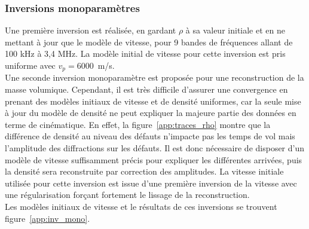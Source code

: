 
\subsubsection{Inversions monoparamètres}


Une première inversion est réalisée, en gardant $\rho$ à sa valeur initiale et en ne mettant à jour que le modèle de vitesse, pour 9 bandes de fréquences allant de 100 kHz à 3,4 MHz. La modèle initial de vitesse pour cette inversion est pris uniforme avec $v_{p}=6000$~m/s.\\

Une seconde inversion monoparamètre est proposée pour une reconstruction de la masse volumique. Cependant, il est très difficile d'assurer une convergence en prenant des modèles initiaux de vitesse et de densité uniformes, car la seule mise à jour du modèle de densité ne peut expliquer la majeure partie des données en terme de cinématique. En effet, la figure~\ref{app:traces_rho} montre que la différence de densité au niveau des défauts n'impacte pas les temps de vol mais l'amplitude des diffractions sur les défauts. Il est donc nécessaire de disposer d'un modèle de vitesse suffisamment précis pour expliquer les différentes arrivées, puis la densité sera reconstruite par correction des amplitudes. La vitesse initiale utilisée pour cette inversion est issue d'une première inversion de la vitesse avec une régularisation forçant fortement le lissage de la reconstruction.\\

Les modèles initiaux de vitesse et le résultats de ces inversions se trouvent figure~\ref{app:inv_mono}. 

